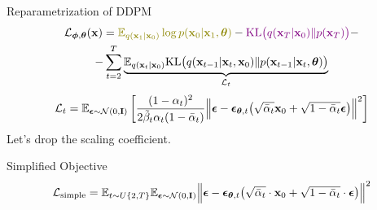 \documentclass{beamer}
\begin{document}
\begin{frame}{Reparametrization of DDPM}
    \begin{multline*}
        \cL_{\bphi, \btheta}(\bx) =  {\color{olive}\bbE_{q(\bx_1 | \bx_0)} \log p(\bx_0 | \bx_1, \btheta)} - {\color{violet}\KL\bigl(q(\bx_T | \bx_0) \| p(\bx_T)\bigr)} - \\
        - \sum_{t=2}^T \underbrace{ \bbE_{q(\bx_t | \bx_0)} \KL \bigl(q(\bx_{t-1} | \bx_t, \bx_0) \| p(\bx_{t-1} | \bx_t, \btheta )\bigr)}_{\cL_t}
    \end{multline*}
    \eqpause
    \vspace{-0.3cm}
    \[
        \mathcal{L}_t  = \mathbb{E}_{\boldsymbol{\epsilon} \sim \mathcal{N}(0, \mathbf{I})} \left[ \frac{(1 - \alpha_t)^2}{2\tilde{\beta}_t \alpha_t (1 - \bar{\alpha}_t)} \Bigl\| \boldsymbol{\epsilon} - \boldsymbol{\epsilon}_{\boldsymbol{\theta}, t}\bigl( \sqrt{\bar{\alpha}_t} \mathbf{x}_0 + \sqrt{1 - \bar{\alpha}_t} \boldsymbol{\epsilon}\bigr) \Bigr\|^2 \right]
    \]
    \eqpause
    Let's drop the scaling coefficient.
    \begin{block}{Simplified Objective}
        \vspace{-0.3cm}
        \[
             \mathcal{L}_{\text{simple}} = \mathbb{E}_{t \sim U\{2, T\}} \mathbb{E}_{\boldsymbol{\epsilon} \sim \mathcal{N}(0, \mathbf{I})} \Bigl\| \boldsymbol{\epsilon} - \boldsymbol{\epsilon}_{\boldsymbol{\theta}, t}\bigl( \sqrt{\bar{\alpha}_t} \cdot \mathbf{x}_0 + \sqrt{1 - \bar{\alpha}_t} \cdot \boldsymbol{\epsilon}\bigr) \Bigr\|^2 
        \]
    \end{block}
\end{frame}
\end{document}
